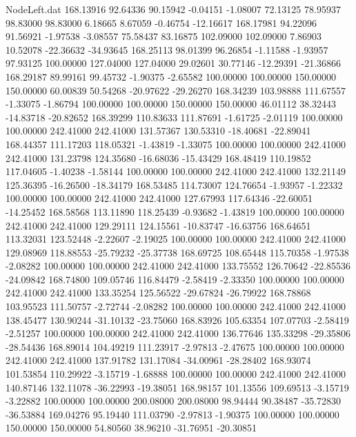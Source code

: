 \begin{filecontents}{NodeLeft.dat}
 168.13916   92.64336   90.15942    -0.04151   -1.08007   72.13125   78.95937   98.83000   98.83000    6.18665    8.67059   -0.46754  -12.16617
 168.17981   94.22096   91.56921    -1.97538   -3.08557   75.58437   83.16875  102.09000  102.09000    7.86903   10.52078  -22.36632  -34.93645
 168.25113   98.01399   96.26854    -1.11588   -1.93957   97.93125  100.00000  127.04000  127.04000   29.02601   30.77146  -12.29391  -21.36866
 168.29187   89.99161   99.45732    -1.90375   -2.65582  100.00000  100.00000  150.00000  150.00000   60.00839   50.54268  -20.97622  -29.26270
 168.34239  103.98888  111.67557    -1.33075   -1.86794  100.00000  100.00000  150.00000  150.00000   46.01112   38.32443  -14.83718  -20.82652
 168.39299  110.83633  111.87691    -1.61725   -2.01119  100.00000  100.00000  242.41000  242.41000  131.57367  130.53310  -18.40681  -22.89041
 168.44357  111.17203  118.05321    -1.43819   -1.33075  100.00000  100.00000  242.41000  242.41000  131.23798  124.35680  -16.68036  -15.43429
 168.48419  110.19852  117.04605    -1.40238   -1.58144  100.00000  100.00000  242.41000  242.41000  132.21149  125.36395  -16.26500  -18.34179
 168.53485  114.73007  124.76654    -1.93957   -1.22332  100.00000  100.00000  242.41000  242.41000  127.67993  117.64346  -22.60051  -14.25452
 168.58568  113.11890  118.25439    -0.93682   -1.43819  100.00000  100.00000  242.41000  242.41000  129.29111  124.15561  -10.83747  -16.63756
 168.64651  113.32031  123.52448    -2.22607   -2.19025  100.00000  100.00000  242.41000  242.41000  129.08969  118.88553  -25.79232  -25.37738
 168.69725  108.65448  115.70358    -1.97538   -2.08282  100.00000  100.00000  242.41000  242.41000  133.75552  126.70642  -22.85536  -24.09842
 168.74800  109.05746  116.84479    -2.58419   -2.33350  100.00000  100.00000  242.41000  242.41000  133.35254  125.56522  -29.67824  -26.79922
 168.78868  103.95523  111.50757    -2.72744   -2.08282  100.00000  100.00000  242.41000  242.41000  138.45477  130.90244  -31.10132  -23.75060
 168.83926  105.63354  107.07703    -2.58419   -2.51257  100.00000  100.00000  242.41000  242.41000  136.77646  135.33298  -29.35806  -28.54436
 168.89014  104.49219  111.23917    -2.97813   -2.47675  100.00000  100.00000  242.41000  242.41000  137.91782  131.17084  -34.00961  -28.28402
 168.93074  101.53854  110.29922    -3.15719   -1.68888  100.00000  100.00000  242.41000  242.41000  140.87146  132.11078  -36.22993  -19.38051
 168.98157  101.13556  109.69513    -3.15719   -3.22882  100.00000  100.00000  200.08000  200.08000   98.94444   90.38487  -35.72830  -36.53884
 169.04276   95.19440  111.03790    -2.97813   -1.90375  100.00000  100.00000  150.00000  150.00000   54.80560   38.96210  -31.76951  -20.30851

\end{filecontents}
